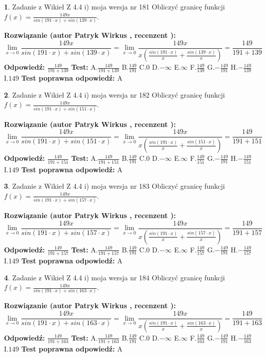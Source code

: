 \documentclass[12pt, a4paper]{article}
\theoremstyle{definition} %
\newtheorem{zad}{}
\newcommand{\zadStart}[1]{\begin{zad}#1\newline}
\newcommand{\zadStop}{\end{zad}}
\newcommand{\rozwStart}[2]{\noindent \textbf{Rozwiązanie (autor #1 , recenzent #2): }\newline}
\newcommand{\rozwStop}{\newline}
\newcommand{\odpStart}{\noindent \textbf{Odpowiedź:}\newline}
\newcommand{\odpStop}{\newline}
\newcommand{\testStart}{\noindent \textbf{Test:}\newline}
\newcommand{\testStop}{\newline}
\newcommand{\kluczStart}{\noindent \textbf{Test poprawna odpowiedź:}\newline}
\newcommand{\kluczStop}{\newline}
\begin{document}
\zadStart{Zadanie z Wikieł Z 4.4 i) moja wersja nr 181}
Obliczyć granicę funkcji $f(x)=\frac{149x}{sin(191\cdot x) +sin(139\cdot x)}$.
\zadStop
\rozwStart{Patryk Wirkus}{}
$$\lim\limits_{x\to 0}\frac{149x}{sin(191\cdot x) +sin(139\cdot x)}=\lim\limits_{x\to 0}\frac{149x}{x(\frac{sin(191\cdot x)}{x}+\frac{sin(139\cdot x)}{x})}=\frac{149}{191+139}$$
\rozwStop
\odpStart
$\frac{149}{191+139}$
\odpStop
\testStart
A.$\frac{149}{191+139}$
B.$\frac{149}{191}$
C.$0$
D.$-\infty$
E.$\infty$
F.$\frac{149}{139}$
G.$-\frac{149}{191}$
H.$-\frac{149}{139}$
I.$149$
\testStop
\kluczStart
A
\kluczStop



\zadStart{Zadanie z Wikieł Z 4.4 i) moja wersja nr 182}
Obliczyć granicę funkcji $f(x)=\frac{149x}{sin(191\cdot x) +sin(151\cdot x)}$.
\zadStop
\rozwStart{Patryk Wirkus}{}
$$\lim\limits_{x\to 0}\frac{149x}{sin(191\cdot x) +sin(151\cdot x)}=\lim\limits_{x\to 0}\frac{149x}{x(\frac{sin(191\cdot x)}{x}+\frac{sin(151\cdot x)}{x})}=\frac{149}{191+151}$$
\rozwStop
\odpStart
$\frac{149}{191+151}$
\odpStop
\testStart
A.$\frac{149}{191+151}$
B.$\frac{149}{191}$
C.$0$
D.$-\infty$
E.$\infty$
F.$\frac{149}{151}$
G.$-\frac{149}{191}$
H.$-\frac{149}{151}$
I.$149$
\testStop
\kluczStart
A
\kluczStop



\zadStart{Zadanie z Wikieł Z 4.4 i) moja wersja nr 183}
Obliczyć granicę funkcji $f(x)=\frac{149x}{sin(191\cdot x) +sin(157\cdot x)}$.
\zadStop
\rozwStart{Patryk Wirkus}{}
$$\lim\limits_{x\to 0}\frac{149x}{sin(191\cdot x) +sin(157\cdot x)}=\lim\limits_{x\to 0}\frac{149x}{x(\frac{sin(191\cdot x)}{x}+\frac{sin(157\cdot x)}{x})}=\frac{149}{191+157}$$
\rozwStop
\odpStart
$\frac{149}{191+157}$
\odpStop
\testStart
A.$\frac{149}{191+157}$
B.$\frac{149}{191}$
C.$0$
D.$-\infty$
E.$\infty$
F.$\frac{149}{157}$
G.$-\frac{149}{191}$
H.$-\frac{149}{157}$
I.$149$
\testStop
\kluczStart
A
\kluczStop



\zadStart{Zadanie z Wikieł Z 4.4 i) moja wersja nr 184}
Obliczyć granicę funkcji $f(x)=\frac{149x}{sin(191\cdot x) +sin(163\cdot x)}$.
\zadStop
\rozwStart{Patryk Wirkus}{}
$$\lim\limits_{x\to 0}\frac{149x}{sin(191\cdot x) +sin(163\cdot x)}=\lim\limits_{x\to 0}\frac{149x}{x(\frac{sin(191\cdot x)}{x}+\frac{sin(163\cdot x)}{x})}=\frac{149}{191+163}$$
\rozwStop
\odpStart
$\frac{149}{191+163}$
\odpStop
\testStart
A.$\frac{149}{191+163}$
B.$\frac{149}{191}$
C.$0$
D.$-\infty$
E.$\infty$
F.$\frac{149}{163}$
G.$-\frac{149}{191}$
H.$-\frac{149}{163}$
I.$149$
\testStop
\kluczStart
A
\kluczStop
\end{document}

